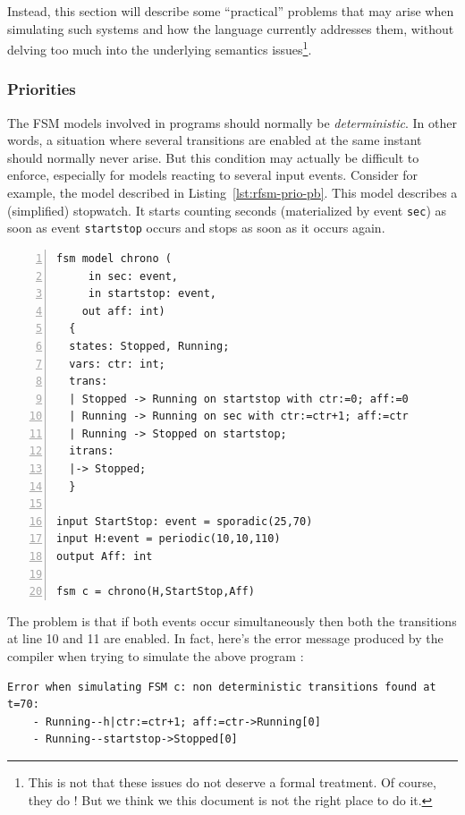 Instead, this section will describe some ``practical'' problems that may arise when simulating such
systems and how the language currently addresses them, without delving too much into the underlying
semantics issues\footnote{This is not that these issues do not deserve a formal treatment. Of
  course, they do ! But we think we this document is not the right place to do it.}.

\subsubsection{Priorities}
\label{sec:priorities}

The FSM models involved in programs should normally be \emph{deterministic}. In other words, a
situation where several transitions are enabled at the same instant should normally never arise. But
this condition may actually be difficult to enforce, especially for models reacting to several input
events. Consider for example, the model described in Listing~\ref{lst:rfsm-prio-pb}. This model
describes a (simplified) stopwatch. It starts counting seconds (materialized by event \verb|sec|)
as soon as event \verb|startstop| occurs and stops as soon as it occurs again.

\begin{lstlisting}[language=Rfsm,frame=single,numbers=left,caption=A program showing a potentially non-deterministic
  model,label={lst:rfsm-prio-pb},float]
fsm model chrono (
     in sec: event,
     in startstop: event,
    out aff: int)
  {
  states: Stopped, Running;
  vars: ctr: int;
  trans:
  | Stopped -> Running on startstop with ctr:=0; aff:=0
  | Running -> Running on sec with ctr:=ctr+1; aff:=ctr
  | Running -> Stopped on startstop;
  itrans:
  |-> Stopped;
  }

input StartStop: event = sporadic(25,70)
input H:event = periodic(10,10,110)
output Aff: int

fsm c = chrono(H,StartStop,Aff)
\end{lstlisting}

The problem is that if both events occur simultaneously  then
both the transitions at line 10 and 11 are enabled. In fact, here's the error message produced by
the compiler when trying to simulate the above program :

\small
\begin{verbatim}
Error when simulating FSM c: non deterministic transitions found at t=70:
	- Running--h|ctr:=ctr+1; aff:=ctr->Running[0]
	- Running--startstop->Stopped[0]
\end{verbatim}
\normalsize

